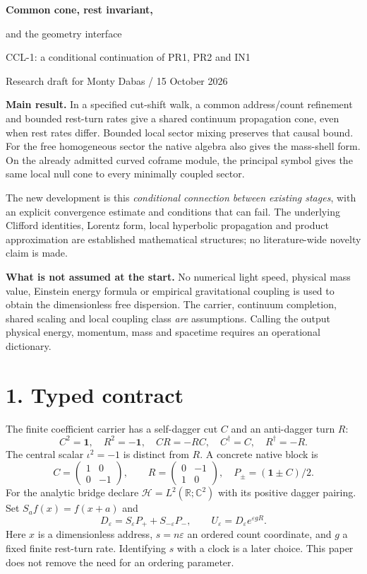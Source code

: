 \documentclass[11pt,a4paper]{article}
\newcommand{\ii}{\iota}\newcommand{\id}{\mathbf1}\newcommand{\dd}{\mathrm d}\newcommand{\tr}{\operatorname{Tr}}
\begin{document}
\begin{center}
{\Large\bfseries\color{ink} Common cone, rest invariant,\par and the geometry interface\par}\vspace{6pt}
{\large CCL-1: a conditional continuation of PR1, PR2 and IN1}\par
Research draft for Monty Dabas / 15 October 2026
\end{center}

\textbf{Main result.} In a specified cut-shift walk, a common address/count refinement and bounded rest-turn rates give a shared continuum propagation cone, even when rest rates differ. Bounded local sector mixing preserves that causal bound. For the free homogeneous sector the native algebra also gives the mass-shell form. On the already admitted curved coframe module, the principal symbol gives the same local null cone to every minimally coupled sector.

The new development is this \emph{conditional connection between existing stages}, with an explicit convergence estimate and conditions that can fail. The underlying Clifford identities, Lorentz form, local hyperbolic propagation and product approximation are established mathematical structures; no literature-wide novelty claim is made.

\textbf{What is not assumed at the start.} No numerical light speed, physical mass value, Einstein energy formula or empirical gravitational coupling is used to obtain the dimensionless free dispersion. The carrier, continuum completion, shared scaling and local coupling class \emph{are} assumptions. Calling the output physical energy, momentum, mass and spacetime requires an operational dictionary.

\section*{1. Typed contract}
The finite coefficient carrier has a self-dagger cut $C$ and an anti-dagger turn $R$:
\[
C^2=\id,\quad R^2=-\id,\quad CR=-RC,\quad C^\dagger=C,\quad R^\dagger=-R.
\]
The central scalar $\ii^2=-1$ is distinct from $R$. A concrete native block is
\[
C=\begin{pmatrix}1&0\\0&-1\end{pmatrix},\qquad
R=\begin{pmatrix}0&-1\\1&0\end{pmatrix},\quad P_\pm=(\id\pm C)/2.
\]
For the analytic bridge declare $\mathcal H=L^2(\mathbb R;\mathbb C^2)$ with its positive dagger pairing. Set $S_a f(x)=f(x+a)$ and
\[
D_\varepsilon=S_\varepsilon P_++S_{-\varepsilon}P_-,\qquad
U_\varepsilon=D_\varepsilon e^{\varepsilon gR}.
\]
Here $x$ is a dimensionless address, $s=n\varepsilon$ an ordered count coordinate, and $g$ a fixed finite rest-turn rate. Identifying $s$ with a clock is a later choice. This paper does not remove the need for an ordering parameter.
\end{document}
